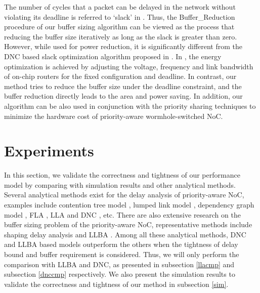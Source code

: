 \documentclass[preprint]{elsarticle}
\begin{document}
The number of cycles that a packet can be delayed in the network without violating its deadline is referred to `slack' in \cite{6560630}. Thus, the Buffer\_Reduction procedure of our buffer sizing algorithm can be viewed as the process that reducing the buffer size iteratively as long as the slack is greater than zero. However, while used for power reduction, it is significantly different from the DNC based slack optimization algorithm proposed in \cite{6560630}. In \cite{6560630}, the energy optimization is achieved by adjusting the voltage, frequency and link bandwidth of on-chip routers for the fixed configuration and deadline. In contrast, our method tries to reduce the buffer size under the deadline constraint, and the buffer reduction directly leads to the area and power saving. In addition, our algorithm can be also used in conjunction with the priority sharing techniques \cite{5161497} to minimize the hardware cost of priority-aware wormhole-switched NoC.

\section{Experiments}\label{experiments}
In this section, we validate the correctness and tightness of our performance model by comparing with simulation results and other analytical methods. Several analytical methods exist for the delay analysis of priority-aware NoC, examples include contention tree model \cite{LuJS05}, lumped link model \cite{707545}, dependency graph model \cite{708526}, FLA \cite{Shi:2008:RCA:1397757.1397996}, LLA \cite{73} and DNC \cite{Qian489900}, etc. There are also extensive research on the buffer sizing problem of the priority-aware NoC, representative methods include shaping delay analysis \cite{Manolache:2006:BSO:1131481.1131683} and LLBA \cite{189}. Among all these analytical methods, DNC \cite{Qian489900} and LLBA \cite{189} based models outperform the others when the tightness of delay bound and buffer requirement is considered. Thus, we will only perform the comparison with LLBA and DNC, as presented in subsection \ref{llacmp} and subsection \ref{dnccmp} respectively. We also present the simulation results to validate the correctness and tightness of our method in subsection \ref{sim}.
\end{document}
